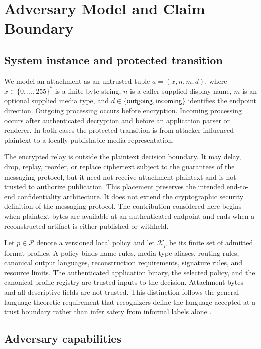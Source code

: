 \section{Adversary Model and Claim Boundary}
\label{sec:extended-adversary}

\subsection{System instance and protected transition}

We model an attachment as an untrusted tuple
$a=(x,n,m,d)$, where $x\in\{0,\ldots,255\}^{*}$ is a finite byte string,
$n$ is a caller-supplied display name, $m$ is an optional supplied media type,
and $d\in\{\mathsf{outgoing},\mathsf{incoming}\}$ identifies the endpoint
direction. Outgoing processing occurs before encryption. Incoming processing
occurs after authenticated decryption and before an application parser or
renderer. In both cases the protected transition is from attacker-influenced
plaintext to a locally publishable media representation.

The encrypted relay is outside the plaintext decision boundary. It may delay,
drop, replay, reorder, or replace ciphertext subject to the guarantees of the
messaging protocol, but it need not receive attachment plaintext and is not
trusted to authorize publication. This placement preserves the intended
end-to-end confidentiality architecture. It does not extend the cryptographic
security definition of the messaging protocol. The contribution considered
here begins when plaintext bytes are available at an authenticated endpoint and
ends when a reconstructed artifact is either published or withheld.

Let $p\in\mathcal{P}$ denote a versioned local policy and let
$\mathcal{K}_{p}$ be its finite set of admitted format profiles. A policy binds
name rules, media-type aliases, routing rules, canonical output languages,
reconstruction requirements, signature rules, and resource limits. The
authenticated application binary, the selected policy, and the canonical
profile registry are trusted inputs to the decision. Attachment bytes and all
descriptive fields are not trusted. This distinction follows the general
language-theoretic requirement that recognizers define the language accepted at
a trust boundary rather than infer safety from informal labels alone
\cite{momot2016}.

\subsection{Adversary capabilities}

